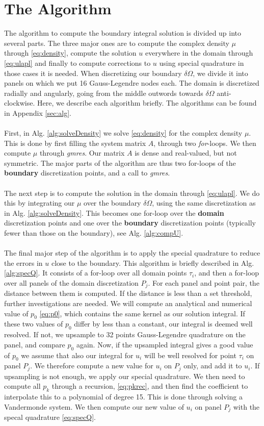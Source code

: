 \documentclass[a4paper,10pt]{article}
\begin{document}
\section*{The Algorithm}
The algorithm to compute the boundary integral solution is divided up into several parts. The three major ones are to compute the complex density $\mu$ through \eqref{eq:density}, compute the solution $u$ everywhere in the domain through \eqref{eq:ulapl} and finally to compute corrections to $u$ using special quadrature in those cases it is needed. When discretizing our boundary $\delta\Omega$, we divide it into panels on which we put 16 Gauss-Legendre nodes each. The domain is discretized radially and angularly, going from the middle outwords towards $\delta\Omega$ anti-clockwise. Here, we describe each algorithm briefly. The algorithms can be found in Appendix \ref{sec:alg}. 
\\ \\
First, in Alg. \ref{alg:solveDensity} we solve \eqref{eq:density} for the complex density $\mu$. This is done by first filling the system matrix $A$, through two \textit{for}-loops. We then compute $\mu$ through \textit{gmres}. Our matrix $A$ is dense and real-valued, but not symmetric. The major parts of the algorithm are thus two for-loops of the \textbf{boundary} discretization points, and a call to \textit{gmres}.
\\ \\
The next step is to compute the solution in the domain through \eqref{eq:ulapl}. We do this by integrating our $\mu$ over the boundary $\delta\Omega$, using the same discretization as in Alg. \ref{alg:solveDensity}. This becomes one for-loop over the \textbf{domain} discretization points and one over the \textbf{boundary} discretization points (typically fewer than those on the boundary), see Alg. \ref{alg:compU}.
\\ \\
The final major step of the algorithm is to apply the special quadrature \cite{ojalahelsing} to reduce the errors in $u$ close to the boundary. This algorithm is briefly described in Alg. \ref{alg:specQ}. It consists of a for-loop over all domain points $\tau_i$, and then a for-loop over all panels of the domain discretization $P_j$. For each panel and point pair, the distance between them is computed. If the distance is less than a set threshold, further investigations are needed. We will compute an analytical and numerical value of $p_0$ \eqref{eq:p0}, which contains the same kernel as our solution integral. If these two values of $p_0$ differ by less than a constant, our integral is deemed well resolved. If not, we upsample to 32 points Gauss-Legendre quadrature on the panel, and compare $p_0$ again. Now, if the upsampled integral gives a good value of $p_0$ we assume that also our integral for $u_i$ will be well resolved for point $\tau_i$ on panel $P_j$. We therefore compute a new value for $u_i$ on $P_j$ only, and add it to $u_i$. If upsampling is not enough, we apply our special quadrature. We then need to compute all $p_k$ through a recursion, \eqref{eq:pkrec}, and then find the coefficient to interpolate this to a polynomial of degree 15. This is done through solving a Vandermonde system. We then compute our new value of $u_i$ on panel $P_j$ with the specal quadrature \eqref{eq:specQ}. 
\end{document}
